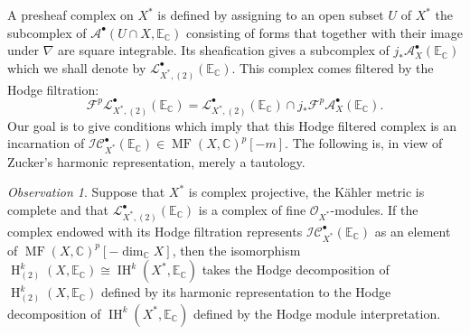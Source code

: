 \documentclass[12pt,letterpaper]{amsart}
\numberwithin{equation}{section}
\def\CC{{\mathbb C}}
\def\EE{{\mathbb E}}
\def\Ascr{{\mathscr A}}
\def\Fcal{{\mathcal F}}
\def\Iscr{{\mathscr I}}
\def\Lscr{{\mathscr L}}
\def\Ocal{{\mathcal O}}
\def\Cscr{{\mathscr C}}
\def\pt{{\scriptscriptstyle\bullet}}
\newcommand\Hl{\operatorname{H}}
\newcommand\IH{\operatorname{IH}}
\newcommand\MF{\operatorname{MF}}
\theoremstyle{remark}
\newtheorem{observation}[theorem]{Observation}
\begin{document}
A presheaf complex on $X^*$ is defined by  assigning to an open subset $U$ of ${X^*}$ the subcomplex
of $\Ascr^\pt(U\cap X,\EE_\CC)$ consisting of forms that together with their image under $\nabla$ are square integrable.
Its sheafication gives   a subcomplex of $ j_* \Ascr_X^\pt(\EE_\CC)$ 
which we shall denote by $\Lscr^\pt_{{X^*},(2)}(\EE_\CC)$.
This complex comes filtered by the Hodge filtration:
\[
\textstyle \Fcal^p\Lscr^\pt_{{X^*},(2)}(\EE_\CC)=\Lscr^\pt_{{X^*},(2)}(\EE_\CC)\cap j_* \Fcal^p\Ascr^{\pt}_X(\EE_\CC).
\]
Our goal is to give conditions which imply  that this Hodge filtered complex is an incarnation of  
$\Iscr\Cscr_{X^*}^\pt(\EE_\CC)\in \MF(X, \CC)^p[-m]$.  The following is, in view of Zucker's  
harmonic representation,  merely a tautology. 

\begin{observation}\label{obs}
Suppose that ${X^*}$ is complex projective,  the K\"ahler metric is complete and that  $\Lscr^\pt_{{X^*},(2)}(\EE_\CC)$ 
is a complex of fine $\Ocal_{X^*}$-modules.
If the complex endowed with its Hodge filtration represents  $\Iscr\Cscr_{X^*}^\pt(\EE_\CC)$ as an element of 
$\MF(X, \CC)^p[-\dim_\CC X]$, then  the isomorphism $\Hl^k_{(2)}(X, \EE_\CC)\cong \IH^k({X^*}, \EE_\CC)$ takes the 
Hodge decomposition of $\Hl^k_{(2)}(X, \EE_\CC)$ defined by its harmonic representation  to the Hodge 
decomposition of $\IH^k({X^*}, \EE_\CC)$  defined by the Hodge module interpretation.
\end{observation}
\end{document}
